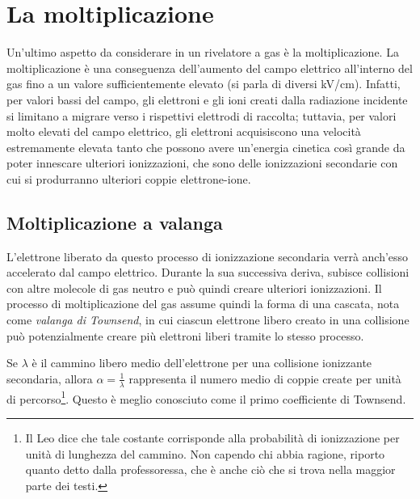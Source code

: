 \section{La moltiplicazione}

Un'ultimo aspetto da considerare in un rivelatore a gas è la moltiplicazione. La moltiplicazione è una conseguenza dell'aumento del campo elettrico all'interno del gas fino a un valore sufficientemente elevato (si parla di diversi kV/cm). Infatti, per valori bassi del campo, gli elettroni e gli ioni creati dalla radiazione incidente si limitano a migrare verso i rispettivi elettrodi di raccolta; tuttavia, per valori molto elevati del campo elettrico, gli elettroni acquisiscono una velocità estremamente elevata tanto che possono avere un'energia cinetica così grande da poter innescare ulteriori ionizzazioni, che sono delle ionizzazioni secondarie con cui si produrranno ulteriori coppie elettrone-ione.

\subsection{Moltiplicazione a valanga}
L'elettrone liberato da questo processo di ionizzazione secondaria verrà anch'esso accelerato dal campo elettrico. Durante la sua successiva deriva, subisce collisioni con altre molecole di gas neutro e può quindi creare ulteriori ionizzazioni. Il processo di moltiplicazione del gas assume quindi la forma di una cascata, nota come \textit{valanga di Townsend}, in cui ciascun elettrone libero creato in una collisione può potenzialmente creare più elettroni liberi tramite lo stesso processo.


Se $\lambda$ è il cammino libero medio dell'elettrone per una collisione ionizzante secondaria, allora $\alpha=\frac{1}{\lambda}$ rappresenta il numero medio di coppie create per unità di percorso\footnote{Il Leo dice che tale costante corrisponde alla probabilità di ionizzazione per unità di lunghezza del cammino. Non capendo chi abbia ragione, riporto quanto detto dalla professoressa, che è anche ciò che si trova nella maggior parte dei testi.}. Questo è meglio conosciuto come il primo coefficiente di Townsend.

